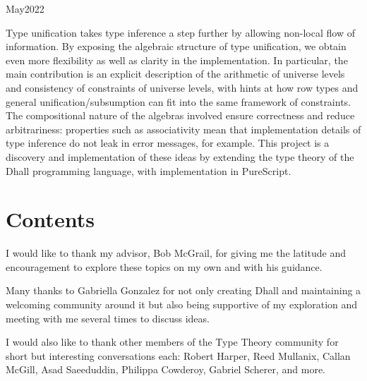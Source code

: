\documentclass[11pt, twoside, reqno]{book}
\makeatletter
\renewcommand\tableofcontents{%
    \if@twocolumn
      \@restonecoltrue\onecolumn
    \else
      \@restonecolfalse
    \fi
    \chapter*{\contentsname
        \@mkboth{%
           \contentsname}{\contentsname}}%
    \@starttoc{toc}%
    \if@restonecol\twocolumn\fi
    }
\newcommand{\resetspacing}{\doublespace}
\makeatother
\begin{document}
\renewcommand{\contentsname}{Contents}
\fancyhead[LE]{\textit{\nouppercase{\leftmark}}}
\fancyhead[RO]{\textit{\nouppercase{\rightmark}}}

    {May}{2022}

\abstr

Type unification takes type inference a step further by allowing non-local flow of information.
By exposing the algebraic structure of type unification, we obtain even more flexibility as well as clarity in the implementation.
In particular, the main contribution is an explicit description of the arithmetic of universe levels and consistency of constraints of universe levels, with hints at how row types and general unification/subsumption can fit into the same framework of constraints.
The compositional nature of the algebras involved ensure correctness and reduce arbitrariness: properties such as associativity mean that implementation details of type inference do not leak in error messages, for example.
This project is a discovery and implementation of these ideas by extending the type theory of the Dhall programming language, with implementation in PureScript.


\tableofcontents



\acknowl

I would like to thank my advisor, Bob McGrail, for giving me the latitude and encouragement to explore these topics on my own and with his guidance.

Many thanks to Gabriella Gonzalez for not only creating Dhall and maintaining a welcoming community around it but also being supportive of my exploration and meeting with me several times to discuss ideas.

I would also like to thank other members of the Type Theory community for short but interesting conversations each: Robert Harper, Reed Mullanix, Callan McGill, Asad Saeeduddin, Philippa Cowderoy, Gabriel Scherer, and more.

\startmain
\resetspacing

\intro
\end{document}
